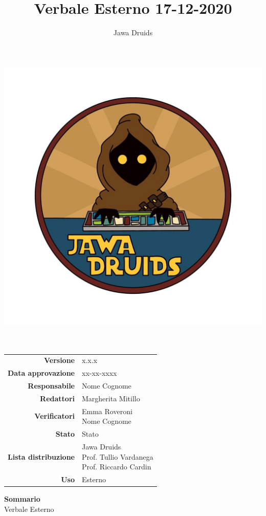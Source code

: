 




\makeatletter
\begin{titlepage}
	\begin{center}
		\vspace*{-5cm}
		\author{Jawa Druids} 
		\title{Verbale Esterno 17-12-2020}
		\date{} %
		\includegraphics[width=0.7\linewidth]{../../immagini/DRUIDSLOGO.jpg}\\[4ex]
		{\huge \bfseries  \@title }\\[2ex] 
		{\LARGE  \@author}\\[50ex]
		\vspace*{-9cm}
		\begin{table}[H]
			\renewcommand{\arraystretch}{1.4}
			\centering
			\begin{tabular}{r | l}
				\textbf{Versione} & x.x.x \\%
				\textbf{Data approvazione} & xx-xx-xxxx\\
				\textbf{Responsabile} & Nome Cognome\\
				\textbf{Redattori} & Margherita Mitillo \\
				\textbf{Verificatori} & \makecell[tl]{Emma Roveroni \\ Nome Cognome} \\
				\textbf{Stato} & Stato\\
				\textbf{Lista distribuzione} & \makecell[tl]{Jawa Druids \\ Prof. Tullio Vardanega \\ Prof. Riccardo Cardin}\\
				\textbf{Uso} & Esterno          
			\end{tabular}
		\end{table}
		\vspace{0.1cm}
		\hfill \break
		\fontsize{17}{10}\textbf{Sommario} \\
		\vspace{0.1cm}
		Verbale Esterno
	\end{center}
\end{titlepage}
\makeatother

